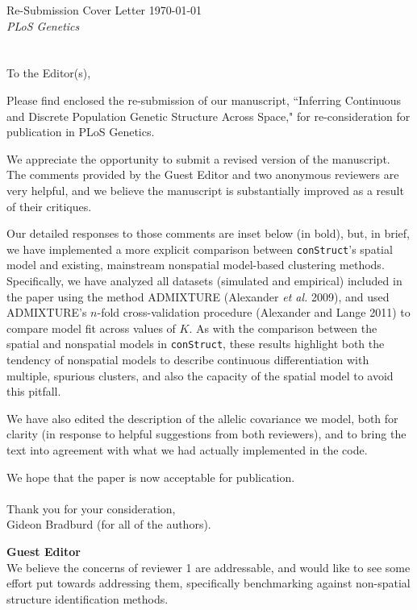 \documentclass[11pt]{letter}
\begin{document}
Re-Submission Cover Letter \hfill	\today\\
\emph{PLoS Genetics}
\\\\\\
To the Editor(s),

Please find enclosed the re-submission of our manuscript, 
``Inferring Continuous and Discrete Population Genetic Structure Across Space,"
for re-consideration for publication in PLoS Genetics.

We appreciate the opportunity to submit a revised version of the manuscript.  
The comments provided by the Guest Editor 
and two anonymous reviewers are very helpful, 
and we believe the manuscript is substantially improved as a result 
of their critiques.

Our detailed responses to those comments are inset below (in bold), 
but, in brief, we have implemented a more explicit comparison between 
\texttt{conStruct}'s spatial model and existing, mainstream nonspatial model-based clustering methods.
Specifically, we have analyzed all datasets (simulated and empirical) 
included in the paper using the method ADMIXTURE (Alexander \textit{et al.} 2009),
and used ADMIXTURE's $n$-fold cross-validation procedure (Alexander and Lange 2011)
to compare model fit across values of $K$.
As with the comparison between the spatial and nonspatial models in \texttt{conStruct}, 
these results highlight both the tendency of nonspatial models 
to describe continuous differentiation with multiple, spurious clusters, 
and also the capacity of the spatial model to avoid this pitfall.

We have also edited the description of the allelic covariance we model,
both for clarity (in response to helpful suggestions from both reviewers), 
and to bring the text into agreement with what we had actually implemented in the code.

We hope that the paper is now acceptable for publication.\\\\
%


Thank you for your consideration,\\
Gideon Bradburd (for all of the authors).

\newpage

\textbf{Guest Editor}\\
We believe the concerns of reviewer 1 are addressable, and would like to see some effort put towards addressing them, specifically benchmarking against non-spatial structure identification methods.
\end{document}
